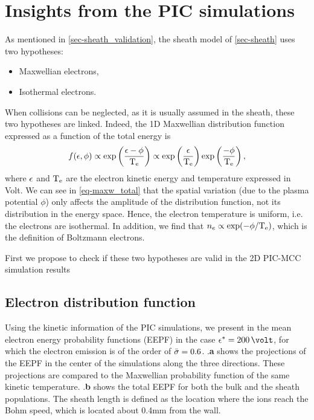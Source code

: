 


\section{Insights from the PIC simulations}
  \label{sec-insights}

  As mentioned in \cref{sec-sheath_validation}, the sheath model of \cref{sec-sheath} uses two hypotheses\string:
  \begin{itemize}
    \item Maxwellian electrons,
    \item Isothermal electrons.
  \end{itemize}

  When collisions can be neglected, as it is usually assumed in the sheath, these two hypotheses are linked.
  Indeed, the \ac{1D} Maxwellian distribution function expressed as a function of the total energy is
  \begin{equation} \label{eq-maxw_total}
    f(\epsilon, \phi) \propto \exp \left( \frac{\epsilon - \phi}{\mathrm{T_e}}  \right)  \propto \exp \left( \frac{\epsilon}{\mathrm{T_e}} \right) \exp \left( \frac{-\phi}{\mathrm{T_e}} \right),
  \end{equation}
  where $\epsilon$ and $\mathrm{T_e}$ are the electron kinetic energy and temperature expressed in Volt.
  We can see in \cref{eq-maxw_total} that the spatial variation (due to the plasma potential $\phi$) only affects the amplitude of the distribution function, not its distribution in the energy space.
  Hence, the electron temperature is uniform, i.e. the electrons are isothermal.
  In addition, we find that $n_e \propto \exp (- \phi / \mathrm{T_e})$, which is the definition of Boltzmann electrons.

  First we propose to check  if these two hypotheses are valid  in the \ac{2D} \ac{PIC}-\ac{MCC} simulation results

  \subsection{Electron distribution function}
    \label{subsec-eedf_2D}

    Using the kinetic information of the PIC simulations, we present in  the mean electron energy probability functions (EEPF) in the case $\crover = 200\,\volt$, for which the electron emission is of the order of $ \bar{\sigma }=0.6$.
    .{\bf a} shows the projections of the EEPF in the center of the simulations along the three directions.
    These projections are compared to the Maxwellian probability function of the same
    kinetic temperature.
    .{\bf b} shows the total EEPF for both the bulk and the sheath populations.
    The sheath length is defined as the location where the ions reach the Bohm speed, which is located about 0.4mm from the wall.
     
